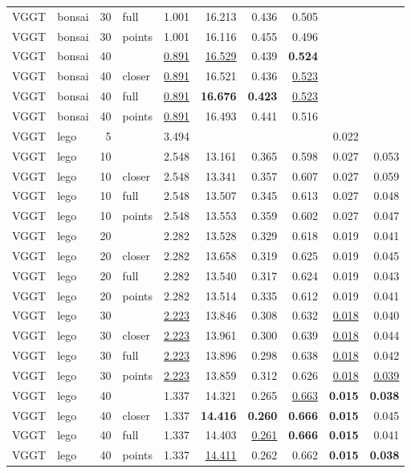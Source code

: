 \begin{table}[H]
\begin{tabular}{llrlrrrrrr}
VGGT & bonsai & 30 & full & 1.001 & 16.213 & 0.436 & 0.505 &  &  \\
VGGT & bonsai & 30 & points & 1.001 & 16.116 & 0.455 & 0.496 &  &  \\
VGGT & bonsai & 40 &  & \underline{0.891} & \underline{16.529} & 0.439 & \textbf{0.524} &  &  \\
VGGT & bonsai & 40 & closer & \underline{0.891} & 16.521 & 0.436 & \underline{0.523} &  &  \\
VGGT & bonsai & 40 & full & \underline{0.891} & \textbf{16.676} & \textbf{0.423} & \underline{0.523} &  &  \\
VGGT & bonsai & 40 & points & \underline{0.891} & 16.493 & 0.441 & 0.516 &  &  \\
\midrule
VGGT & lego & 5 &  & 3.494 &  &  &  & 0.022 &  \\
VGGT & lego & 10 &  & 2.548 & 13.161 & 0.365 & 0.598 & 0.027 & 0.053 \\
VGGT & lego & 10 & closer & 2.548 & 13.341 & 0.357 & 0.607 & 0.027 & 0.059 \\
VGGT & lego & 10 & full & 2.548 & 13.507 & 0.345 & 0.613 & 0.027 & 0.048 \\
VGGT & lego & 10 & points & 2.548 & 13.553 & 0.359 & 0.602 & 0.027 & 0.047 \\
VGGT & lego & 20 &  & 2.282 & 13.528 & 0.329 & 0.618 & 0.019 & 0.041 \\
VGGT & lego & 20 & closer & 2.282 & 13.658 & 0.319 & 0.625 & 0.019 & 0.045 \\
VGGT & lego & 20 & full & 2.282 & 13.540 & 0.317 & 0.624 & 0.019 & 0.043 \\
VGGT & lego & 20 & points & 2.282 & 13.514 & 0.335 & 0.612 & 0.019 & 0.041 \\
VGGT & lego & 30 &  & \underline{2.223} & 13.846 & 0.308 & 0.632 & \underline{0.018} & 0.040 \\
VGGT & lego & 30 & closer & \underline{2.223} & 13.961 & 0.300 & 0.639 & \underline{0.018} & 0.044 \\
VGGT & lego & 30 & full & \underline{2.223} & 13.896 & 0.298 & 0.638 & \underline{0.018} & 0.042 \\
VGGT & lego & 30 & points & \underline{2.223} & 13.859 & 0.312 & 0.626 & \underline{0.018} & \underline{0.039} \\
VGGT & lego & 40 &  & 1.337 & 14.321 & 0.265 & \underline{0.663} & \textbf{0.015} & \textbf{0.038} \\
VGGT & lego & 40 & closer & 1.337 & \textbf{14.416} & \textbf{0.260} & \textbf{0.666} & \textbf{0.015} & 0.045 \\
VGGT & lego & 40 & full & 1.337 & 14.403 & \underline{0.261} & \textbf{0.666} & \textbf{0.015} & 0.041 \\
VGGT & lego & 40 & points & 1.337 & \underline{14.411} & 0.262 & 0.662 & \textbf{0.015} & \textbf{0.038} \\
\bottomrule
\end{tabular}
\end{table}